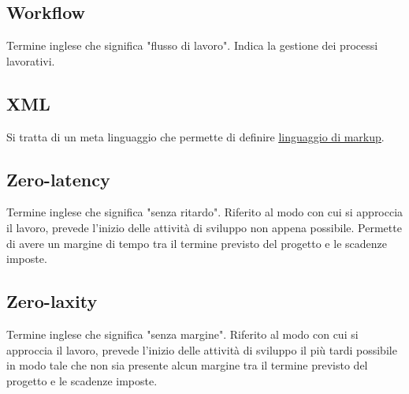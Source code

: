 	\subsection{Workflow}
	\label{sec:workflow}
	Termine inglese che significa "flusso di lavoro". Indica la gestione dei processi lavorativi.


	\newpage


	\subsection{XML}
	\label{sec:xml}
	Si tratta di un meta linguaggio che permette di definire \underline{\hyperref[sec:linguaggiomarkup]{linguaggio di markup}}.


	\newpage


	\subsection{Zero-latency}
	\label{sec:zerolatency}
	Termine inglese che significa "senza ritardo". Riferito al modo con cui si approccia il lavoro, prevede l'inizio delle attività di sviluppo non appena possibile. Permette di avere un margine di tempo tra il termine previsto del progetto e le scadenze imposte.


	\subsection{Zero-laxity}
	\label{sec:zerolaxity}
	Termine inglese che significa "senza margine". Riferito al modo con cui si approccia il lavoro, prevede l'inizio delle attività di sviluppo il più tardi possibile in modo tale che non sia presente alcun margine tra il termine previsto del progetto e le scadenze imposte.



